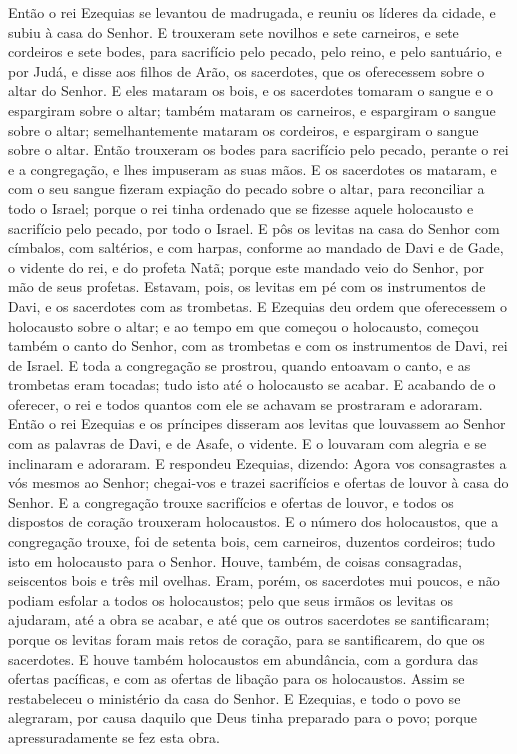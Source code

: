 Então o rei Ezequias se levantou de madrugada, e reuniu os
líderes da cidade, e subiu à casa do Senhor. E trouxeram sete
novilhos e sete carneiros, e sete cordeiros e sete bodes, para
sacrifício pelo pecado, pelo reino, e pelo santuário, e por Judá, e
disse aos filhos de Arão, os sacerdotes, que os oferecessem sobre o
altar do Senhor. E eles mataram os bois, e os sacerdotes
tomaram o sangue e o espargiram sobre o altar; também mataram os
carneiros, e espargiram o sangue sobre o altar; semelhantemente
mataram os cordeiros, e espargiram o sangue sobre o altar.
Então trouxeram os bodes para sacrifício pelo pecado, perante
o rei e a congregação, e lhes impuseram as suas mãos. E os
sacerdotes os mataram, e com o seu sangue fizeram expiação do pecado
sobre o altar, para reconciliar a todo o Israel; porque o rei tinha
ordenado que se fizesse aquele holocausto e sacrifício pelo pecado,
por todo o Israel. E pôs os levitas na casa do Senhor com
címbalos, com saltérios, e com harpas, conforme ao mandado de Davi e
de Gade, o vidente do rei, e do profeta Natã; porque este mandado
veio do Senhor, por mão de seus profetas. Estavam, pois, os
levitas em pé com os instrumentos de Davi, e os sacerdotes com as
trombetas. E Ezequias deu ordem que oferecessem o holocausto
sobre o altar; e ao tempo em que começou o holocausto, começou
também o canto do Senhor, com as trombetas e com os instrumentos de
Davi, rei de Israel. E toda a congregação se prostrou, quando
entoavam o canto, e as trombetas eram tocadas; tudo isto até o
holocausto se acabar. E acabando de o oferecer, o rei e todos
quantos com ele se achavam se prostraram e adoraram. Então o
rei Ezequias e os príncipes disseram aos levitas que louvassem ao
Senhor com as palavras de Davi, e de Asafe, o vidente. E o louvaram
com alegria e se inclinaram e adoraram. E respondeu Ezequias,
dizendo: Agora vos consagrastes a vós mesmos ao Senhor; chegai-vos e
trazei sacrifícios e ofertas de louvor à casa do Senhor. E a
congregação trouxe sacrifícios e ofertas de louvor, e todos os
dispostos de coração trouxeram holocaustos. E o número dos
holocaustos, que a congregação trouxe, foi de setenta bois, cem
carneiros, duzentos cordeiros; tudo isto em holocausto para o
Senhor. Houve, também, de coisas consagradas, seiscentos bois
e três mil ovelhas. Eram, porém, os sacerdotes mui poucos, e
não podiam esfolar a todos os holocaustos; pelo que seus irmãos os
levitas os ajudaram, até a obra se acabar, e até que os outros
sacerdotes se santificaram; porque os levitas foram mais retos de
coração, para se santificarem, do que os sacerdotes. E houve
também holocaustos em abundância, com a gordura das ofertas
pacíficas, e com as ofertas de libação para os holocaustos. Assim se
restabeleceu o ministério da casa do Senhor. E Ezequias, e
todo o povo se alegraram, por causa daquilo que Deus tinha preparado
para o povo; porque apressuradamente se fez esta obra.

